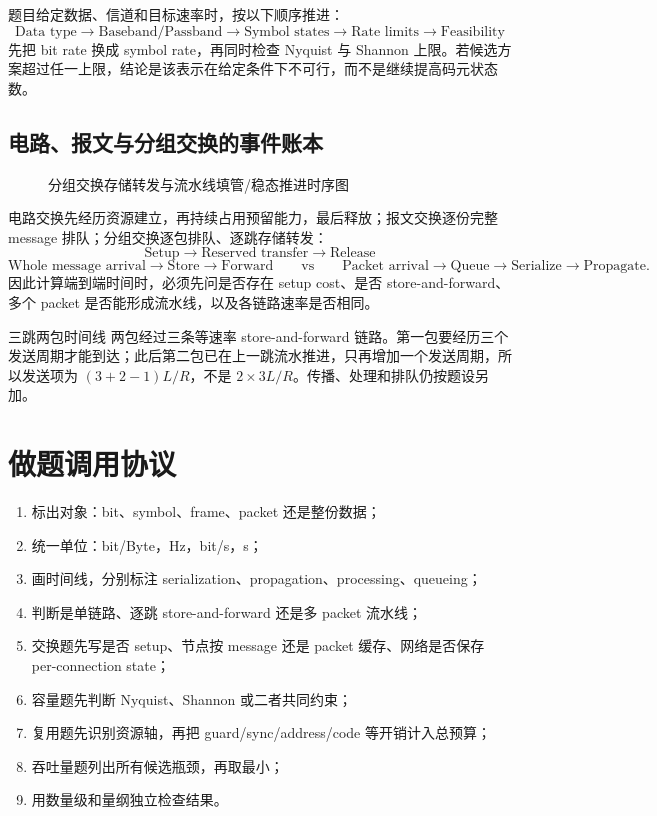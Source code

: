 \documentclass[UTF8,fontset=none,11pt,a4paper]{ctexart}
\providecommand{\tightlist}{\setlength{\itemsep}{0pt}\setlength{\parskip}{0pt}}
\begin{document}
题目给定数据、信道和目标速率时，按以下顺序推进：
\[
\boxed{\text{Data type}\to\text{Baseband/Passband}\to\text{Symbol states}\to\text{Rate limits}\to\text{Feasibility}}
\]
先把 bit rate 换成 symbol rate，再同时检查 Nyquist 与 Shannon 上限。若候选方案超过任一上限，结论是该表示在给定条件下不可行，而不是继续提高码元状态数。

\subsection{电路、报文与分组交换的事件账本}

\begin{figure}[htbp]
  \centering
  \resizebox{0.96\linewidth}{!}{}
  \caption{分组交换存储转发与流水线填管/稳态推进时序图}
  \label{fig:store-forward-pipeline}
\end{figure}


电路交换先经历资源建立，再持续占用预留能力，最后释放；报文交换逐份完整 message 排队；分组交换逐包排队、逐跳存储转发：
\[
\text{Setup}\to\text{Reserved transfer}\to\text{Release}
\]
\[
\text{Whole message arrival}\to\text{Store}\to\text{Forward}
\qquad\text{vs}\qquad
\text{Packet arrival}\to\text{Queue}\to\text{Serialize}\to\text{Propagate}.
\]
因此计算端到端时间时，必须先问是否存在 setup cost、是否 store-and-forward、多个 packet 是否能形成流水线，以及各链路速率是否相同。

\begin{examplebox}{三跳两包时间线}
两包经过三条等速率 store-and-forward 链路。第一包要经历三个发送周期才能到达；此后第二包已在上一跳流水推进，只再增加一个发送周期，所以发送项为 $(3+2-1)L/R$，不是 $2\times3L/R$。传播、处理和排队仍按题设另加。
\end{examplebox}

\section{做题调用协议}\label{9-ux505aux9898ux8c03ux7528ux534fux8bae}

\begin{enumerate}
\def\labelenumi{\arabic{enumi}.}
\tightlist
\item
  标出对象：bit、symbol、frame、packet 还是整份数据；
\item
  统一单位：bit/Byte，Hz，bit/s，s；
\item
  画时间线，分别标注 serialization、propagation、processing、queueing；
\item
  判断是单链路、逐跳 store-and-forward 还是多 packet 流水线；
\item
  交换题先写是否 setup、节点按 message 还是 packet 缓存、网络是否保存 per-connection state；
\item
  容量题先判断 Nyquist、Shannon 或二者共同约束；
\item
  复用题先识别资源轴，再把 guard/sync/address/code 等开销计入总预算；
\item
  吞吐量题列出所有候选瓶颈，再取最小；
\item
  用数量级和量纲独立检查结果。
\end{enumerate}
\end{document}
